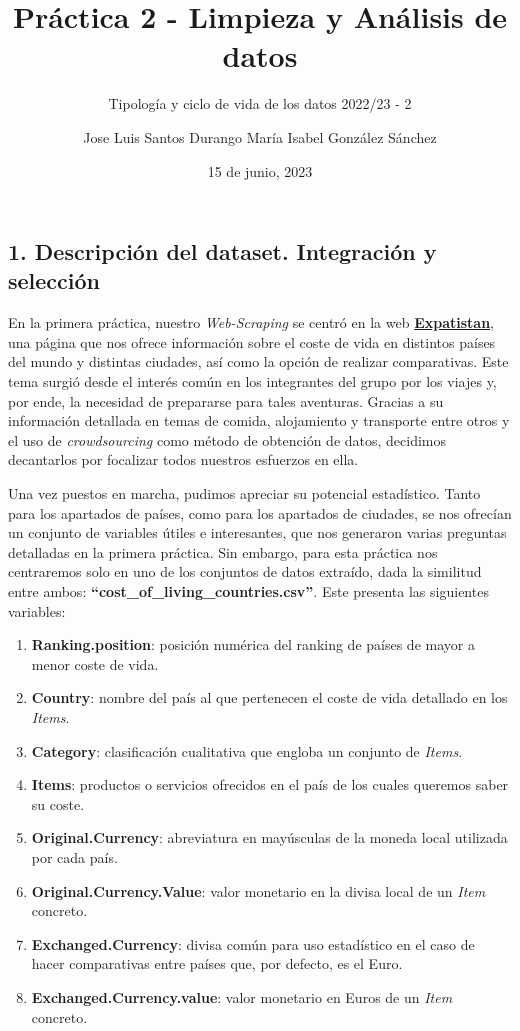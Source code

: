 \documentclass[
]{article}
\title{Práctica 2 - Limpieza y Análisis de datos}
\subtitle{Tipología y ciclo de vida de los datos \textbar{} 2022/23 - 2}
\author{Jose Luis Santos Durango \textbar{} María Isabel González
Sánchez}
\date{15 de junio, 2023}
\begin{document}
\maketitle

{
\setcounter{tocdepth}{4}
\tableofcontents
}
\newpage

\hypertarget{descripciuxf3n-del-dataset.-integraciuxf3n-y-selecciuxf3n}{%
\subsection{1. Descripción del dataset. Integración y
selección}\label{descripciuxf3n-del-dataset.-integraciuxf3n-y-selecciuxf3n}}

En la primera práctica, nuestro \emph{Web-Scraping} se centró en la web
\href{https://www.expatistan.com/check/humanity}{\textbf{Expatistan}},
una página que nos ofrece información sobre el coste de vida en
distintos países del mundo y distintas ciudades, así como la opción de
realizar comparativas. Este tema surgió desde el interés común en los
integrantes del grupo por los viajes y, por ende, la necesidad de
prepararse para tales aventuras. Gracias a su información detallada en
temas de comida, alojamiento y transporte entre otros y el uso de
\emph{crowdsourcing} como método de obtención de datos, decidimos
decantarlos por focalizar todos nuestros esfuerzos en ella.

Una vez puestos en marcha, pudimos apreciar su potencial estadístico.
Tanto para los apartados de países, como para los apartados de ciudades,
se nos ofrecían un conjunto de variables útiles e interesantes, que nos
generaron varias preguntas detalladas en la primera práctica. Sin
embargo, para esta práctica nos centraremos solo en uno de los conjuntos
de datos extraído, dada la similitud entre ambos:
\textbf{``cost\_of\_living\_countries.csv''}. Este presenta las
siguientes variables:

\begin{enumerate}
\def\labelenumi{\arabic{enumi}.}
\item
  \textbf{Ranking.position}: posición numérica del ranking de países de
  mayor a menor coste de vida.
\item
  \textbf{Country}: nombre del país al que pertenecen el coste de vida
  detallado en los \emph{Items}.
\item
  \textbf{Category}: clasificación cualitativa que engloba un conjunto
  de \emph{Items}.
\item
  \textbf{Items}: productos o servicios ofrecidos en el país de los
  cuales queremos saber su coste.
\item
  \textbf{Original.Currency}: abreviatura en mayúsculas de la moneda
  local utilizada por cada país.
\item
  \textbf{Original.Currency.Value}: valor monetario en la divisa local
  de un \emph{Item} concreto.
\item
  \textbf{Exchanged.Currency}: divisa común para uso estadístico en el
  caso de hacer comparativas entre países que, por defecto, es el Euro.
\item
  \textbf{Exchanged.Currency.value}: valor monetario en Euros de un
  \emph{Item} concreto.
\end{enumerate}
\end{document}
